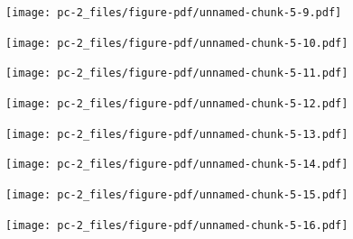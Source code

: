 \documentclass[
  letterpaper,
  DIV=11,
  numbers=noendperiod]{scrreprt}
\begin{document}
\begin{figure}[H]

{\centering \texttt{[image: pc-2\_files/figure-pdf/unnamed-chunk-5-9.pdf]}

}

\end{figure}

\begin{figure}[H]

{\centering \texttt{[image: pc-2\_files/figure-pdf/unnamed-chunk-5-10.pdf]}

}

\end{figure}

\begin{figure}[H]

{\centering \texttt{[image: pc-2\_files/figure-pdf/unnamed-chunk-5-11.pdf]}

}

\end{figure}

\begin{figure}[H]

{\centering \texttt{[image: pc-2\_files/figure-pdf/unnamed-chunk-5-12.pdf]}

}

\end{figure}

\begin{figure}[H]

{\centering \texttt{[image: pc-2\_files/figure-pdf/unnamed-chunk-5-13.pdf]}

}

\end{figure}

\begin{figure}[H]

{\centering \texttt{[image: pc-2\_files/figure-pdf/unnamed-chunk-5-14.pdf]}

}

\end{figure}

\begin{figure}[H]

{\centering \texttt{[image: pc-2\_files/figure-pdf/unnamed-chunk-5-15.pdf]}

}

\end{figure}

\begin{figure}[H]

{\centering \texttt{[image: pc-2\_files/figure-pdf/unnamed-chunk-5-16.pdf]}

}

\end{figure}
\end{document}
